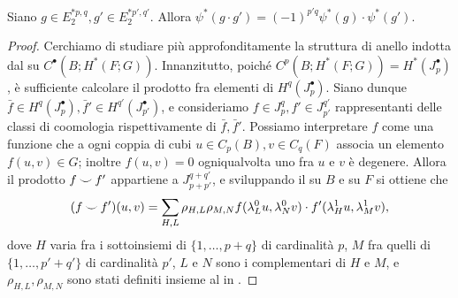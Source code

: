 \begin{proposition}
Siano $g\in E^{\ast p,q}_2,g'\in E^{\ast p',q'}_2$. Allora $\psi^*(g\cdot g')=(-1)^{p'q}\psi^*(g)\cdot\psi^*(g')$.
\end{proposition}
\begin{proof}
Cerchiamo di studiare più approfonditamente la struttura di anello indotta dal \cupproduct{} su $C^\bullet(B;H^*(F;G))$. Innanzitutto, poiché $C^p(B;H^*(F;G))=H^*(J^\bullet_p)$, è sufficiente calcolare il prodotto fra elementi di $H^q(J^\bullet_p)$. Siano dunque $\bar{f}\in H^q(J^\bullet_p),\bar{f}'\in H^{q'}(J^\bullet_{p'})$, e consideriamo $f\in J^q_p,f'\in J^{q'}_{p'}$ rappresentanti delle classi di coomologia rispettivamente di $\bar{f},\bar{f}'$. Possiamo interpretare $f$ come una funzione che a ogni coppia di cubi $u\in C_p(B),v\in C_q(F)$ associa un elemento $f(u,v)\in G$; inoltre $f(u,v)=0$ ogniqualvolta uno fra $u$ e $v$ è degenere. Allora il prodotto $f\mathbin{\smile} f'$ appartiene a $J^{q+q'}_{p+p'}$, e sviluppando il \cupproduct{} su $B$ e su $F$ si ottiene che
$$
(f\mathbin{\smile} f')(u,v)=\sum_{H,L}\rho_{H,L}\rho_{M,N}f(\lambda^0_Lu,\lambda^0_Nv)\cdot f'(\lambda^1_Hu,\lambda^1_Mv),
$$
dove $H$ varia fra i sottoinsiemi di $\{1,\ldots,p+q\}$ di cardinalità $p$, $M$ fra quelli di $\{1,\ldots,p'+q'\}$ di cardinalità $p'$, $L$ e $N$ sono i complementari di $H$ e $M$, e $\rho_{H,L},\rho_{M,N}$ sono stati definiti insieme al \cupproduct{} in \missing{}.
\end{proof}